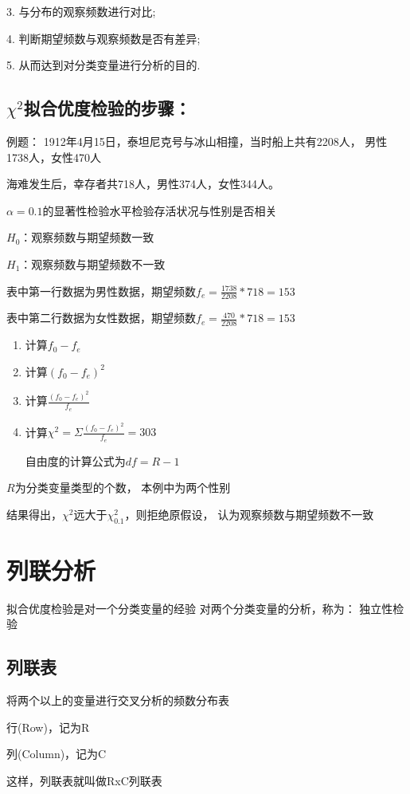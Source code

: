\documentclass[UTF8,10pt]{book}
\begin{document}
3. 与分布的观察频数进行对比; 

4. 判断期望频数与观察频数是否有差异; 

5. 从而达到对分类变量进行分析的目的.	

\subsection{$\chi^2$拟合优度检验的步骤：} 
例题：
1912年4月15日，泰坦尼克号与冰山相撞，当时船上共有2208人，
男性1738人，女性470人 

海难发生后，幸存者共718人，男性374人，女性344人。

$\alpha=0.1$的显著性检验水平检验存活状况与性别是否相关	

$H_0$：观察频数与期望频数一致 

$H_1$：观察频数与期望频数不一致 

表中第一行数据为男性数据，期望频数$f_e = \frac{1738}{2208} * 718 = 153$ 

表中第二行数据为女性数据，期望频数$f_e = \frac{470}{2208} * 718 = 153$ 


\begin{enumerate}
	\item 计算$f_0 -f_e$ 
	\item 计算$(f_0 -f_e)^2$ 
	\item 计算$\frac{(f_0 -f_e)^2}{f_e}$ 
	\item 计算$\chi^2 = \Sigma \frac{(f_0-f_e)^2}{f_e} = 303 $
	
	自由度的计算公式为$df = R - 1 $
\end{enumerate}  

$R$为分类变量类型的个数，
本例中为两个性别 

结果得出，$\chi^2$远大于$\chi_{0.1}^2$，则拒绝原假设，
认为观察频数与期望频数不一致	

\section{列联分析}
拟合优度检验是对一个分类变量的经验 对两个分类变量的分析，称为：	独立性检验	

\subsection{列联表}	
将两个以上的变量进行交叉分析的频数分布表 

行(Row)，记为R 

列(Column)，记为C 

这样，列联表就叫做RxC列联表	
\end{document}
